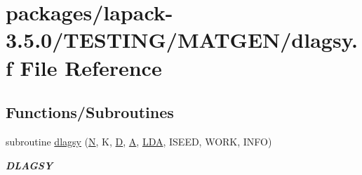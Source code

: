 \hypertarget{dlagsy_8f}{}\section{packages/lapack-\/3.5.0/\+T\+E\+S\+T\+I\+N\+G/\+M\+A\+T\+G\+E\+N/dlagsy.f File Reference}
\label{dlagsy_8f}
\subsection*{Functions/\+Subroutines}
\begin{DoxyCompactItemize}
\item 
subroutine \hyperlink{group__double__matgen_ga5f743c86cc2e595aef8e6f8662562026}{dlagsy} (\hyperlink{polmisc_8c_a0240ac851181b84ac374872dc5434ee4}{N}, K, \hyperlink{odrpack_8h_a7dae6ea403d00f3687f24a874e67d139}{D}, \hyperlink{classA}{A}, \hyperlink{example__user_8c_ae946da542ce0db94dced19b2ecefd1aa}{L\+D\+A}, I\+S\+E\+E\+D, W\+O\+R\+K, I\+N\+F\+O)
\begin{DoxyCompactList}\small\item\em {\bfseries D\+L\+A\+G\+S\+Y} \end{DoxyCompactList}\end{DoxyCompactItemize}

